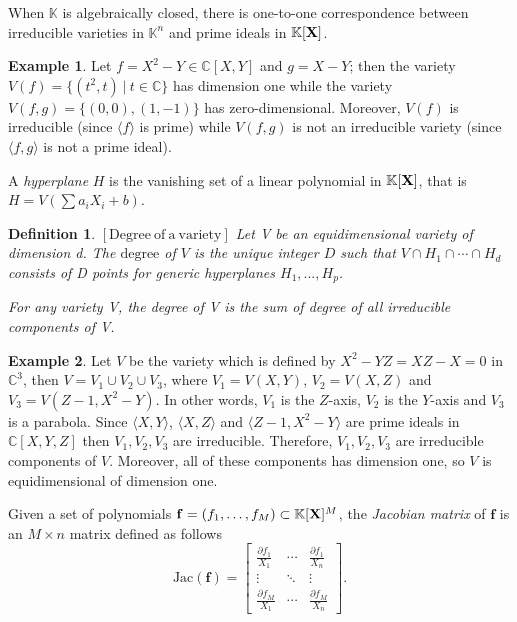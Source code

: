 \documentclass[11pt]{article}
\numberwithin{Property}{section}
\newtheorem{Theorem}{Theorem}%
\numberwithin{Theorem}{section}
\numberwithin{Proposition}{section}
\numberwithin{Lemma}{section}
\numberwithin{Corollary}{section}
\newtheorem{Definition}{Definition}%
\numberwithin{Definition}{section}
\numberwithin{Remark}{section}
\numberwithin{Conjecture}{section}
\numberwithin{Problem}{section}
\numberwithin{Claim}{section}
\theoremstyle{definition}
\newtheorem{Example}{Example}%
\numberwithin{Example}{section}
\def\bar{\overline}
\newcommand{\field}{\mathbb{K}} %
\newcommand{\mat}[1]{\mathbf{\MakeUppercase{#1}}} %
\newcommand{\todo}[1]{\textcolor{red}{#1}} %
\begin{document}
When $\field$ is algebraically closed, there is one-to-one correspondence between irreducible varieties in $\field^n$ and prime ideals in $\field[\mat{X}]$. 

\begin{Example}Let $f = X^2-Y \in \mathbb{C}[X,Y]$ and $g = X-Y$; then the variety $V(f) = \{(t^2,t) \ | \ t \in \mathbb{C}\}$ has dimension one while the variety $V(f,g) = \{(0,0), (1,-1)\}$ has zero-dimensional. Moreover, $V(f)$ is irreducible (since $\langle f \rangle$ is prime) while $V(f,g)$ is not an irreducible variety (since $\langle f,g \rangle$ is not a prime ideal). 
\end{Example}
A \emph{hyperplane} $H$ is the vanishing set of a linear polynomial in $\field[\mat{X}]$, that is $H = V(\sum a_iX_i + b)$. 
\begin{Definition}$\mathrm{[Degree \ of \ a \ variety]}$ Let V be an equidimensional variety of dimension d. The $\mathrm{degree}$ of $V$ is the unique integer $D$ such that $V \cap H_1 \cap \cdots \cap H_d$ consists of D points for generic hyperplanes $H_1, \ldots, H_p$. 

For any variety V, the degree of V is the sum of degree of all irreducible components of V. 
\end{Definition}
\begin{Example} Let $V$ be the variety which is defined by $X^2 - YZ = XZ-X = 0$ in $\mathbb{C}^3$, then $V = V_1 \cup V_2 \cup V_3$, where $V_1 = V(X,Y)$, $V_2 = V(X,Z)$ and $V_3 = V(Z-1,X^2 - Y)$. In other words, $V_1$ is the $Z$-axis, $V_2$ is the $Y$-axis and $V_3$ is a parabola.  Since $\langle X,Y\rangle$, $\langle X,Z\rangle$ and $\langle Z-1,X^2 - Y \rangle$ are prime ideals in $\mathbb{C}[X,Y,Z]$ then $V_1, V_2, V_3$ are irreducible. Therefore, $V_1, V_2, V_3$ are irreducible components of $V$. Moreover, all of these components has dimension one, so $V$ is equidimensional of dimension one. 
\end{Example}
Given a set of polynomials $\mathbf{f} = (f_1, \ldots, f_M) \subset \field[\mat{X}]^M$, the \emph{Jacobian matrix} of $\mathbf{f}$ is an $M \times n$ matrix defined as follows 
\[
\mathrm{Jac}(\mathbf{f}) = \left[ \begin{matrix}
\frac{\partial f_1}{X_1}  & \cdots & \frac{\partial f_1}{X_n}\\
\vdots & \ddots & \vdots\\
\frac{\partial f_M}{X_1}  & \cdots & \frac{\partial f_M}{X_n}
\end{matrix} \right].
\]
\end{document}
